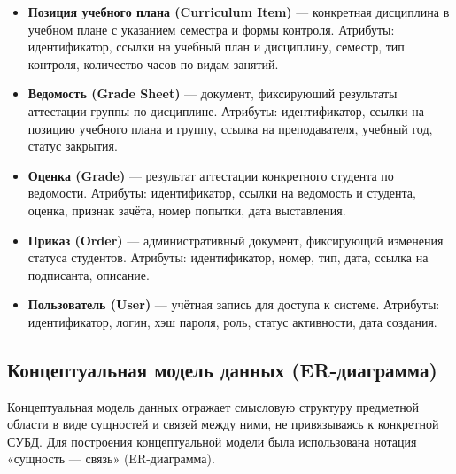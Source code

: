 \documentclass[14pt, a4paper]{extreport}
\begin{document}
\begin{itemize}
    \item \textbf{Позиция учебного плана (Curriculum Item)} --- конкретная дисциплина в учебном плане с указанием семестра и формы контроля. Атрибуты: идентификатор, ссылки на учебный план и дисциплину, семестр, тип контроля, количество часов по видам занятий.
    \item \textbf{Ведомость (Grade Sheet)} --- документ, фиксирующий результаты аттестации группы по дисциплине. Атрибуты: идентификатор, ссылки на позицию учебного плана и группу, ссылка на преподавателя, учебный год, статус закрытия.
    \item \textbf{Оценка (Grade)} --- результат аттестации конкретного студента по ведомости. Атрибуты: идентификатор, ссылки на ведомость и студента, оценка, признак зачёта, номер попытки, дата выставления.
    \item \textbf{Приказ (Order)} --- административный документ, фиксирующий изменения статуса студентов. Атрибуты: идентификатор, номер, тип, дата, ссылка на подписанта, описание.
    \item \textbf{Пользователь (User)} --- учётная запись для доступа к системе. Атрибуты: идентификатор, логин, хэш пароля, роль, статус активности, дата создания.
\end{itemize}

\subsection{Концептуальная модель данных (ER-диаграмма)}
Концептуальная модель данных отражает смысловую структуру предметной области в виде сущностей и связей между ними, не привязываясь к конкретной СУБД. Для построения концептуальной модели была использована нотация «сущность --- связь» (ER-диаграмма).
\end{document}
